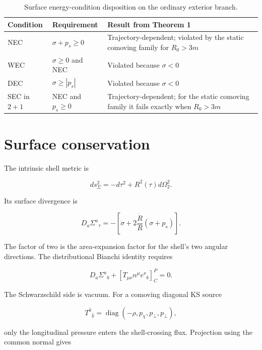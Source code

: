 \documentclass[pdflatex,sn-mathphys-num]{sn-jnl}
\begin{document}
\begin{table}[t]
\centering
\caption{Surface energy-condition disposition on the ordinary exterior branch.}
\small
\begin{tabularx}{\textwidth}{@{}XXX@{}}
\toprule
Condition & Requirement & Result from Theorem 1 \\
\midrule
NEC & \(\sigma+p_s\ge0\) & Trajectory-dependent; violated by the static comoving family for \(R_0>3m\) \\
WEC & \(\sigma\ge0\) and NEC & Violated because \(\sigma<0\) \\
DEC & \(\sigma\ge|p_s|\) & Violated because \(\sigma<0\) \\
SEC in \(2+1\) & NEC and \(p_s\ge0\) & Trajectory-dependent; for the static comoving family it fails exactly when \(R_0>3m\) \\
\bottomrule
\end{tabularx}
\end{table}

\section{Surface conservation}

The intrinsic shell metric is


\begin{equation}
ds_\Sigma^2=-d\tau^2+R^2(\tau)d\Omega_2^2.
\tag{42}
\end{equation}

Its surface divergence is


\begin{equation}
D_a\Sigma^a{}_\tau
=-\left[
\dot\sigma
+2\frac{\dot R}{R}(\sigma+p_s)
\right].
\tag{43}
\end{equation}

The factor of two is the area-expansion factor for the shell’s two angular directions. The distributional Bianchi identity requires


\begin{equation}
D_a\Sigma^a{}_b
+[T_{\mu\nu}n^\mu e^\nu{}_b]^P_C=0.
\tag{44}
\end{equation}

The Schwarzschild side is vacuum. For a comoving diagonal KS source


\[
T^{\hat a}{}_{\hat b}
=\operatorname{diag}(-\rho,p_\chi,p_\perp,p_\perp),
\]

only the longitudinal pressure enters the shell-crossing flux. Projection using the common normal gives
\end{document}
